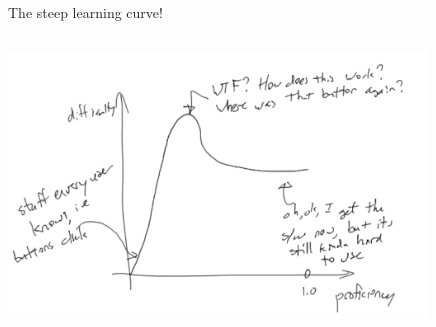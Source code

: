 \documentclass[professionalfonts, xcolor={usenames,svgnames,x11names,table}]{beamer}
\begin{document}
\begin{frame}{The steep learning curve! }

\begin{columns}
\begin{column}{0.5\textwidth}
        \begin{itemize}
        \end{itemize}
        \vspace{0.5cm}
          \includegraphics[width=30em]{./img/learning_curve}
\end{column}
\begin{column}{0.5\textwidth}
\end{column}
\end{columns}
\end{frame}
\end{document}
